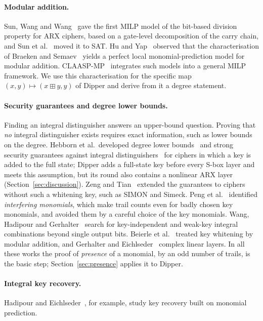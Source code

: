\documentclass[pdflatex,sn-mathphys-num]{sn-jnl}
\theoremstyle{thmstyleone}
\theoremstyle{thmstylethree}
\theoremstyle{thmstyletwo}
\newcommand{\modadd}{\boxplus}
\begin{document}
\paragraph{Modular addition.} Sun, Wang and Wang~\cite{sun2016arx} gave the first MILP model of the bit-based division property for ARX ciphers, based on a gate-level decomposition of the carry chain, and Sun et al.~\cite{sun2017sat} moved it to SAT. Hu and Yap~\cite{huyap2024} observed that the characterisation of Braeken and Semaev~\cite{braeken2005} yields a perfect local monomial-prediction model for modular addition. CLAASP-MP~\cite{bellini2026claaspmp} integrates such models into a general MILP framework. We use this characterisation for the specific map $(x,y)\mapsto(x\modadd y,y)$ of Dipper and derive from it a degree statement.

\paragraph{Security guarantees and degree lower bounds.} Finding an integral distinguisher answers an upper-bound question. Proving that \emph{no} integral distinguisher exists requires exact information, such as lower bounds on the degree. Hebborn et al.\ developed degree lower bounds~\cite{hebborn2020} and strong security guarantees against integral distinguishers~\cite{hebborn2021} for ciphers in which a key is added to the full state; Dipper adds a full-state key before every S-box layer and meets this assumption, but its round also contains a nonlinear ARX layer (Section~\ref{sec:discussion}). Zeng and Tian~\cite{zeng2024} extended the guarantees to ciphers without such a whitening key, such as SIMON and Simeck. Peng et al.~\cite{peng2026} identified \emph{interfering monomials}, which make trail counts even for badly chosen key monomials, and avoided them by a careful choice of the key monomials. Wang, Hadipour and Gerhalter~\cite{wang2026split} search for key-independent and weak-key integral combinations beyond single output bits. Beierle et al.~\cite{beierle2025} treated key whitening by modular addition, and Gerhalter and Eichlseder~\cite{gerhalter2026} complex linear layers. In all these works the proof of \emph{presence} of a monomial, by an odd number of trails, is the basic step; Section~\ref{sec:presence} applies it to Dipper.

\paragraph{Integral key recovery.} Hadipour and Eichlseder~\cite{hadipour2022}, for example, study key recovery built on monomial prediction.
\end{document}
